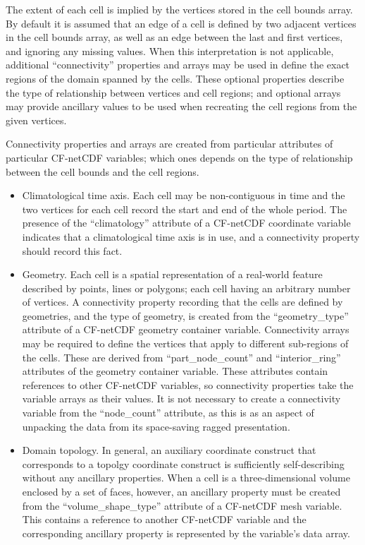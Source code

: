 The extent of each cell is implied by the vertices stored in the cell
bounds array. By default it is assumed that an edge of a cell is
defined by two adjacent vertices in the cell bounds array, as well as
an edge between the last and first vertices, and ignoring any missing
values. When this interpretation is not applicable, additional
``connectivity'' properties and arrays may be used in define the exact
regions of the domain spanned by the cells. These optional properties
describe the type of relationship between vertices and cell regions;
and optional arrays may provide ancillary values to be used when
recreating the cell regions from the given vertices.

Connectivity properties and arrays are created from particular
attributes of particular CF-netCDF variables; which ones depends on
the type of relationship between the cell bounds and the cell regions.

\begin{itemize}

\item Climatological time axis. Each cell may be non-contiguous in
  time and the two vertices for each cell record the start and end of
  the whole period. The presence of the ``climatology'' attribute of a
  CF-netCDF coordinate variable indicates that a climatological time
  axis is in use, and a connectivity property should record this fact.
  
\item Geometry. Each cell is a spatial representation of a real-world
  feature described by points, lines or polygons; each cell having an
  arbitrary number of vertices. A connectivity property recording that
  the cells are defined by geometries, and the type of geometry, is
  created from the ``geometry\_type'' attribute of a CF-netCDF
  geometry container variable. Connectivity arrays may be required to
  define the vertices that apply to different sub-regions of the
  cells. These are derived from ``part\_node\_count'' and
  ``interior\_ring'' attributes of the geometry container
  variable. These attributes contain references to other CF-netCDF
  variables, so connectivity properties take the variable arrays as
  their values. It is not necessary to create a connectivity variable
  from the ``node\_count'' attribute, as this is as an aspect of
  unpacking the data from its space-saving ragged presentation.

\item Domain topology. In general, an auxiliary coordinate construct
  that corresponds to a topolgy coordinate construct is sufficiently
  self-describing without any ancillary properties. When a cell is a
  three-dimensional volume enclosed by a set of faces, however, an
  ancillary property must be created from the ``volume\_shape\_type''
  attribute of a CF-netCDF mesh variable. This contains a reference to
  another CF-netCDF variable and the corresponding ancillary property
  is represented by the variable's data array.
  
\end{itemize}



